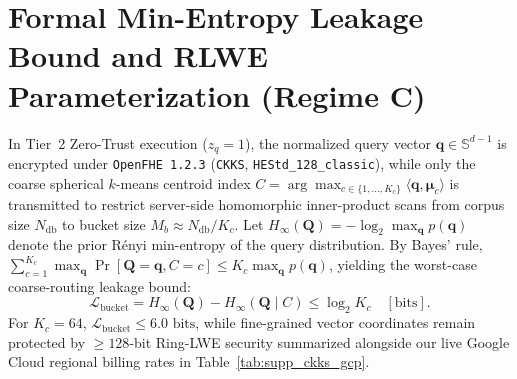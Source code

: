 \documentclass[10pt,journal,compsoc]{IEEEtran}
\begin{document}
\section{Formal Min-Entropy Leakage Bound and RLWE Parameterization (Regime C)}\label{sec:supp_leakage}
In Tier~2 Zero-Trust execution ($z_q = 1$), the normalized query vector $\mathbf{q} \in \mathbb{S}^{d-1}$ is encrypted under \texttt{OpenFHE~1.2.3} (\texttt{CKKS}, \texttt{HEStd\_128\_classic}), while only the coarse spherical $k$-means centroid index $C = \arg\max_{c \in \{1,\dots,K_c\}} \langle \mathbf{q}, \boldsymbol{\mu}_c \rangle$ is transmitted to restrict server-side homomorphic inner-product scans from corpus size $N_{\text{db}}$ to bucket size $M_b \approx N_{\text{db}}/K_c$. Let $H_\infty(\mathbf{Q}) = -\log_2 \max_{\mathbf{q}} p(\mathbf{q})$ denote the prior R\'enyi min-entropy of the query distribution. By Bayes' rule, $\sum_{c=1}^{K_c} \max_{\mathbf{q}} \Pr[\mathbf{Q}=\mathbf{q}, C=c] \le K_c \max_{\mathbf{q}} p(\mathbf{q})$, yielding the worst-case coarse-routing leakage bound:
\begin{equation}
\mathcal{L}_{\text{bucket}} = H_\infty(\mathbf{Q}) - H_\infty(\mathbf{Q} \mid C) \le \log_2 K_c \quad [\text{bits}].
\label{eq:supp_min_entropy}
\end{equation}
For $K_c = 64$, $\mathcal{L}_{\text{bucket}} \le 6.0\text{ bits}$, while fine-grained vector coordinates remain protected by $\ge 128$-bit Ring-LWE security summarized alongside our live Google Cloud regional billing rates in Table~\ref{tab:supp_ckks_gcp}.
\end{document}
